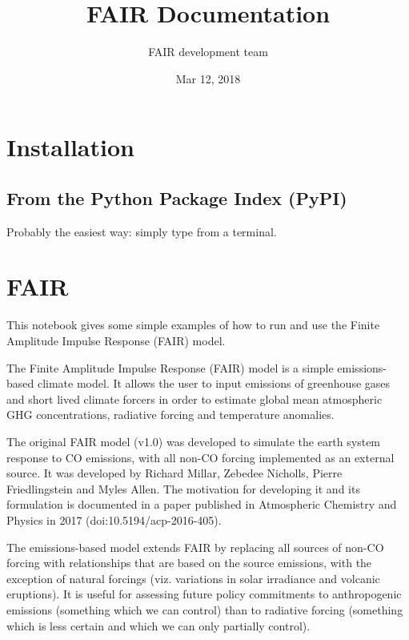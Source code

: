 \documentclass[letterpaper,10pt,english]{sphinxmanual}
\title{FAIR Documentation}
\date{Mar 12, 2018}
\author{FAIR development team}
\begin{document}
\maketitle
\sphinxtableofcontents
{}\label{\detokenize{index::doc}}



\chapter{Installation}
\label{\detokenize{installation:installation}}\label{\detokenize{installation:fair-finite-amplitude-impulse-response-simple-climate-model}}\label{\detokenize{installation::doc}}

\section{From the Python Package Index (PyPI)}
\label{\detokenize{installation:from-the-python-package-index-pypi}}
Probably the easiest way: simply type  from a terminal.


\chapter{FAIR}
\label{\detokenize{Example-Usage::doc}}\label{\detokenize{Example-Usage:fair}}
This notebook gives some simple examples of how to run and use the
Finite Amplitude Impulse Response (FAIR) model.

The Finite Amplitude Impulse Response (FAIR) model is a simple
emissions-based climate model. It allows the user to input emissions of
greenhouse gases and short lived climate forcers in order to estimate
global mean atmospheric GHG concentrations, radiative forcing and
temperature anomalies.

The original FAIR model (v1.0) was developed to simulate the earth
system response to CO emissions, with all non-CO
forcing implemented as an \sphinxquotedblleft{}external\sphinxquotedblright{} source. It was developed by Richard
Millar, Zebedee Nicholls, Pierre Friedlingstein and Myles Allen. The
motivation for developing it and its formulation is documented in a
paper published in Atmospheric Chemistry and Physics in 2017
(doi:10.5194/acp-2016-405).

The emissions-based model extends FAIR by replacing all sources of
non-CO forcing with relationships that are based on the
source emissions, with the exception of natural forcings (viz.
variations in solar irradiance and volcanic eruptions). It is useful for
assessing future policy commitments to anthropogenic emissions
(something which we can control) than to radiative forcing (something
which is less certain and which we can only partially control).
\end{document}
